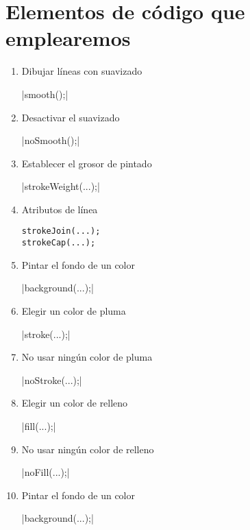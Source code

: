 \documentclass[a4paper,oneside]{article}
\begin{document}
\section{Elementos de código que emplearemos}
\begin{enumerate}
  \item Dibujar líneas con suavizado

     |smooth();|
  \item Desactivar el suavizado

     |noSmooth();|
  \item Establecer el grosor de pintado

     |strokeWeight(...);|
  \item Atributos de línea

    \begin{verbatim}
strokeJoin(...);
strokeCap(...);
    \end{verbatim}
  \item Pintar el fondo de un color

     |background(...);|
  \item Elegir un color de pluma

     |stroke(...);|
  \item No usar ningún color de pluma

     |noStroke(...);|
  \item Elegir un color de relleno

     |fill(...);|
  \item No usar ningún color de relleno

     |noFill(...);|
  \item Pintar el fondo de un color

     |background(...);|
\end{enumerate}
\end{document}
